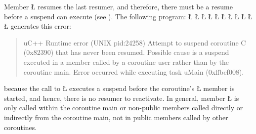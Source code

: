 \documentclass[openright,twoside]{report}
\begin{document}
Member \LGinlinetrue\LGbegin\lgrinde\L{}\endlgrinde\LGend{} resumes the last resumer, and therefore, there must be a resume before a suspend can execute (see ).
The following program:
\LGinlinefalse\LGbegin\lgrinde
\L{}
\L{\LB{}}
\L{}
\L{\LB{}}
\L{\LB{}}
\CE{}\L{\LB{}}
\L{\LB{\};}}
\L{}
\L{\LB{}}
\L{\LB{}}
\L{\LB{\}}}
\endlgrinde\LGend
generates this error:
\begin{quote}
\BGfont
uC++ Runtime error (UNIX pid:24258) Attempt to suspend coroutine C (0x82390) that has never been resumed.
Possible cause is a suspend executed in a member called by a coroutine user rather than by the coroutine main.
Error occurred while executing task uMain (0xffbef008).
\end{quote}
because the call to \LGinlinetrue\LGbegin\lgrinde\L{}\endlgrinde\LGend{} executes a suspend before the coroutine's \LGinlinetrue\LGbegin\lgrinde\L{}\endlgrinde\LGend{} member is started, and hence, there is no resumer to reactivate.
In general, member \LGinlinetrue\LGbegin\lgrinde\L{}\endlgrinde\LGend{} is only called within the coroutine main or non-public members called directly or indirectly from the coroutine main, not in public members called by other coroutines.
\end{document}
